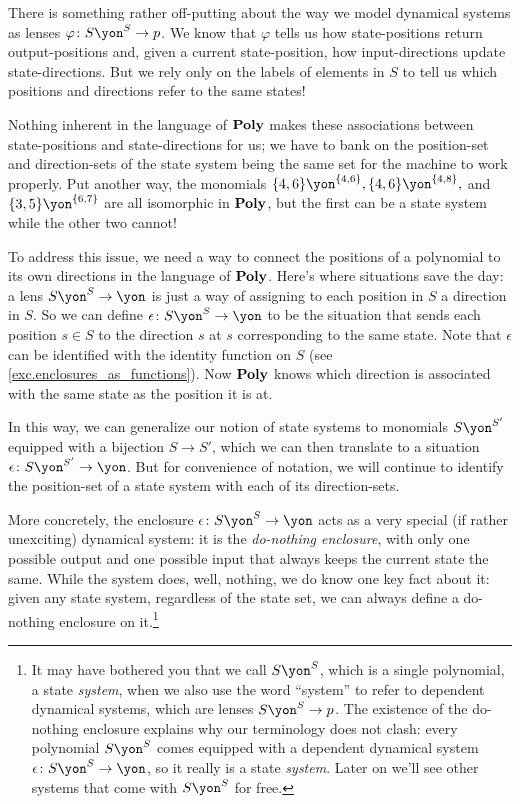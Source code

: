 \documentclass[Book-Poly]{subfiles}
\begin{document}
\begin{example} \label{ex.do_nothing}
There is something rather off-putting about the way we model dynamical systems as lenses $\varphi\colon S\yon^S\to p$.
We know that $\varphi$ tells us how state-positions return output-positions and, given a current state-position, how input-directions update state-directions.
But we rely only on the labels of elements in $S$ to tell us which positions and directions refer to the same states!

Nothing inherent in the language of $\mathbf{Poly}$ makes these associations between state-positions and state-directions for us; we have to bank on the position-set and direction-sets of the state system being the same set for the machine to work properly.
Put another way, the monomials $\{4,6\}\yon^{\{4,6\}},\{4,6\}\yon^{\{4,8\}},$ and $\{3,5\}\yon^{\{6,7\}}$ are all isomorphic in $\mathbf{Poly}$, but the first can be a state system while the other two cannot!

To address this issue, we need a way to connect the positions of a polynomial to its own directions in the language of $\mathbf{Poly}$.
Here's where situations save the day: a lens $S\yon^S\to\yon$ is just a way of assigning to each position in $S$ a direction in $S$.
So we can define $\epsilon\colon S\yon^S\to\yon$ to be the situation that sends each position $s\in S$ to the direction $s$ at $s$ corresponding to the same state.
Note that $\epsilon$ can be identified with the identity function on $S$ (see \cref{exc.enclosures_as_functions}).
Now $\mathbf{Poly}$ knows which direction is associated with the same state as the position it is at.

In this way, we can generalize our notion of state systems to monomials $S\yon^{S'}$ equipped with a bijection $S\to S'$, which we can then translate to a situation $\epsilon\colon S\yon^{S'}\to\yon$.
But for convenience of notation, we will continue to identify the position-set of a state system with each of its direction-sets.

More concretely, the enclosure $\epsilon\colon S\yon^S\to\yon$ acts as a very special (if rather unexciting) dynamical system: it is the \emph{do-nothing enclosure}, with only one possible output and one possible input that always keeps the current state the same.
While the system does, well, nothing, we do know one key fact about it: given any state system, regardless of the state set, we can always define a do-nothing enclosure on it.\footnote{It may have bothered you that we call $S\yon^S$, which is a single polynomial, a state \emph{system}, when we also use the word ``system'' to refer to dependent dynamical systems, which are lenses $S\yon^S\to p$.
The existence of the do-nothing enclosure explains why our terminology does not clash: every polynomial $S\yon^S$ comes equipped with a dependent dynamical system $\epsilon\colon S\yon^S\to\yon$, so it really is a state \emph{system}.
Later on we'll see other systems that come with $S\yon^S$ for free.}


\end{example}
\end{document}
